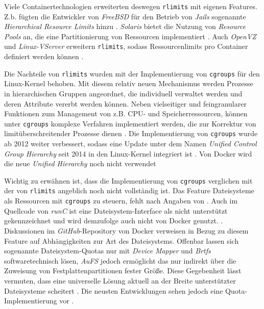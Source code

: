 \documentclass[../main.tex]{subfiles}
\begin{document}

		Viele Containertechnologien erweiterten deswegen \texttt{\acrshort{rlimits}} mit eigenen Features. Z.b. fügten die Entwickler von \emph{FreeBSD} für den Betrieb von \emph{Jails} sogenannte \emph{Hierarchical Resource Limits} hinzu \cite{freeBsdRCTL}. \emph{Solaris} bietet die Nutzung von \emph{Resource Pools} an, die eine Partitionierung von Ressourcen implementiert \cite{cgroupsUniHierarchyDoc}. Auch \emph{OpenVZ} und \emph{Linux-VServer} erweitern \texttt{\acrshort{rlimits}}, sodass Ressourcenlimits pro Container definiert werden können \cite[S.15+16]{dockerSec2}.

		Die Nachteile von \texttt{\acrshort{rlimits}} wurden mit der Implementierung von \texttt{\acrshort{cgroups}} für den Linux-Kernel behoben. Mit diesem relativ neuen Mechanismus werden Prozesse in hierarchischen Gruppen angeordnet, die individuell verwaltet werden und deren Attribute vererbt werden können. Neben vielseitiger und feingranularer Funktionen zum Management von z.B. \acrshort{CPU}- und Speicherressourcen, können unter \texttt{\acrshort{cgroups}} komplexe Verfahren implementiert werden, die zur Korrektur von limitüberschreitender Prozesse dienen \cite{cgroupsRedhat}. Die Implementierung von \texttt{\acrshort{cgroups}} wurde ab 2012 weiter verbessert, sodass eine Update unter dem Namen \emph{Unified Control Group Hierarchy} seit 2014 in den Linux-Kernel integriert ist \cite{cgroupsFixing}\cite{cgroupsUniHierarchy}. Von Docker wird die neue \emph{Unified Hierarchy} noch nicht verwendet \cite{ https://github.com/docker/docker/issues/16238 }

		Wichtig zu erwähnen ist, dass die Implementierung von \texttt{\acrshort{cgroups}} verglichen mit der von \texttt{\acrshort{rlimits}} angeblich noch nicht vollständig ist. Das Feature Dateisysteme als Ressourcen mit \texttt{\acrshort{cgroups}} zu steuern, fehlt nach Angaben von \cite[S.19]{dockerSec2}. Auch im Quellcode von \emph{runC} ist eine Dateisystem-Interface als \glqq{}nicht unterstützt\grqq{} gekennzeichnet und wird demzufolge auch nicht von Docker genutzt. \cite{githubRunCCgroups}. Diskussionen im \emph{GitHub}-Repository von Docker verweisen in Bezug zu diesem Feature auf Abhängigkeiten zur Art des Dateisystems. Offenbar lassen sich sogenannte Dateisystem-Quotas nur mit \emph{Device Mapper} und \emph{Brtfs} softwaretechnisch lösen, \emph{AuFS} jedoch ermöglicht das nur indirekt über die Zuweisung von Festplattenpartitionen fester Größe. Diese Gegebenheit lässt vermuten, dass eine universelle Lösung aktuell an der Breite unterstützter Dateisysteme scheitert \cite{githubDockerIssueFsQuota}. Die neusten Entwicklungen sehen jedoch eine Quota-Implementierung vor \cite{githubDockerPullBrtfs}.
\end{document}
